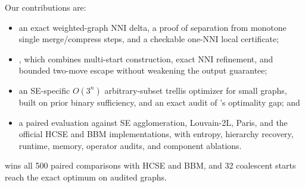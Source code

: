 Our contributions are:
\begin{itemize}
  \renewcommand{\labelitemi}{\textbullet}
  \item an exact weighted-graph NNI delta, a proof of separation from monotone
  single merge/compress steps, and a checkable one-NNI local certificate;
  \item \NEST, which combines multi-start construction, exact NNI refinement,
  and bounded two-move escape without weakening the output guarantee;
  \item an SE-specific $O(3^n)$ arbitrary-subset trellis optimizer for small
  graphs, built on prior binary sufficiency, and an exact audit of \NEST's
  optimality gap; and
  \item a paired evaluation against SE agglomeration, Louvain-2L, Paris, and
  the official HCSE and BBM implementations, with entropy, hierarchy recovery,
  runtime, memory, operator audits, and component ablations.
\end{itemize}

\NEST wins all 500 paired comparisons with HCSE and BBM, and 32 coalescent
starts reach the exact optimum on \ScaleCombinedExact{} audited graphs.
